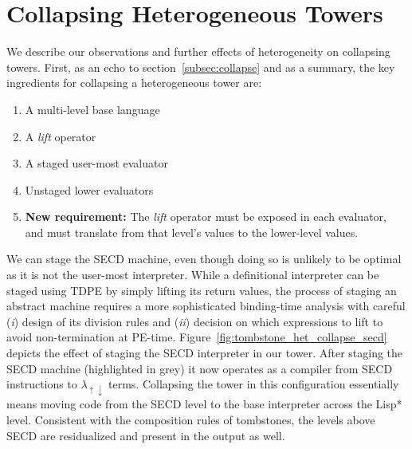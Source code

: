 \documentclass[sigplan,anonymous,review]{acmart}
\newcommand{\mslang}{$\lambda_{\uparrow\downarrow}$}
\theoremstyle{definition}
\begin{document}
\section{Collapsing Heterogeneous Towers}\label{subsec:collapseh}
We describe our observations and further effects of heterogeneity on collapsing towers.
First, as an echo to section~\ref{subsec:collapse} and as a summary, the key ingredients for collapsing a heterogeneous tower are:
\begin{enumerate}
    \item A multi-level base language
    \item A \textit{lift} operator
    \item A staged user-most evaluator
    \item Unstaged lower evaluators
    \item \textbf{New requirement: } The \textit{lift} operator must be exposed in each evaluator, and must translate from that level's values to the lower-level values.
\end{enumerate}

We can stage the SECD machine, even though doing so is unlikely to be
optimal as it is not the user-most interpreter.
While a definitional interpreter can be staged using TDPE by simply lifting
its return values, the process of staging an abstract machine requires a more sophisticated binding-time analysis with careful ({\it i\/}) design of its division rules
and ({\it ii\/}) decision on which expressions 
to lift to avoid non-termination at PE-time.
Figure~\ref{fig:tombstone_het_collapse_secd} depicts the effect of staging the SECD interpreter in our tower. After staging the SECD machine (highlighted in grey) it now operates as a compiler from SECD instructions to \mslang{} terms. Collapsing the tower in this configuration essentially means moving code from the SECD level to the base interpreter across the Lisp* level. Consistent with the composition rules of tombstones, the levels above SECD are residualized and present in the output as well.
\end{document}
